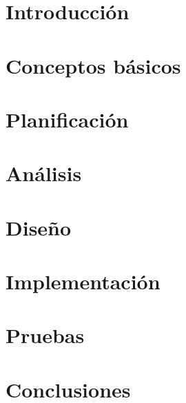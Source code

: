 \documentclass[a4paper,11pt,spanish]{book}
\begin{document}
\renewcommand{\figurename}{Figura}
\renewcommand{\listfigurename}{Índice de figuras}
\renewcommand{\tablename}{Tabla}
\renewcommand{\listtablename}{Índice de tablas}
\renewcommand{\lstlistingname}{Listado}
\renewcommand*\lstlistlistingname{Índice de listados}

\pagestyle{empty}

\cleardoublepage


\cleardoublepage
\pagestyle{plain}

\frontmatter %


\cleardoublepage

\tableofcontents
\listoffigures
\listoftables
\lstlistoflistings


\mainmatter %

\chapter{Introducción}


\chapter{Conceptos básicos}


\chapter{Planificación}


\chapter{Análisis}


\chapter{Diseño}


\chapter{Implementación}


\chapter{Pruebas}


\chapter{Conclusiones}

\end{document}
